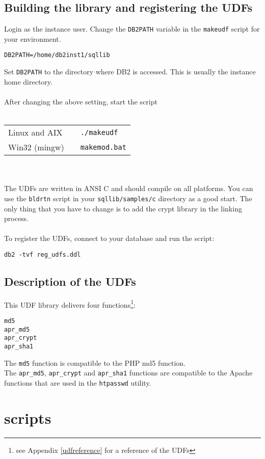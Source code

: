 \documentclass[11pt,a4paper]{article}
\begin{document}
\subsection{Building the library and registering the UDFs}
Login as the instance user. Change the {\tt DB2PATH} variable in the {\tt makeudf} script for your environment.
\begin{verbatim}
DB2PATH=/home/db2inst1/sqllib
\end{verbatim}
Set {\tt DB2PATH} to the directory where DB2 is accessed. This is usually the instance home directory.\\
\\
After changing the above setting, start the script\\
\\
\begin{tabular}{@{} lll @{}}
Linux and AIX & & {\tt ./makeudf}\\
Win32 (mingw) & & {\tt makemod.bat}\\
\end{tabular}
\\\\
The UDFs are written in ANSI C and should compile on all platforms.
You can use the {\tt bldrtn} script in your {\tt sqllib/samples/c} directory as a good start.
The only thing that you have to change is to add the crypt library in the linking process.\\
\\
To register the UDFs, connect to your database and run the script:
\begin{verbatim}
db2 -tvf reg_udfs.ddl
\end{verbatim}
\subsection{Description of the UDFs}
This UDF library delivers four functions\footnote{see Appendix \ref{udfreference} for a reference of the UDFs}:
\begin{verbatim}
md5
apr_md5
apr_crypt
apr_sha1
\end{verbatim}
The {\tt md5} function is compatible to the PHP md5 function.\\
The {\tt apr\_md5}, {\tt apr\_crypt} and {\tt apr\_sha1} functions are compatible to the Apache functions that are used in the {\tt htpasswd} utility.
\newpage

\section{scripts}
\end{document}
